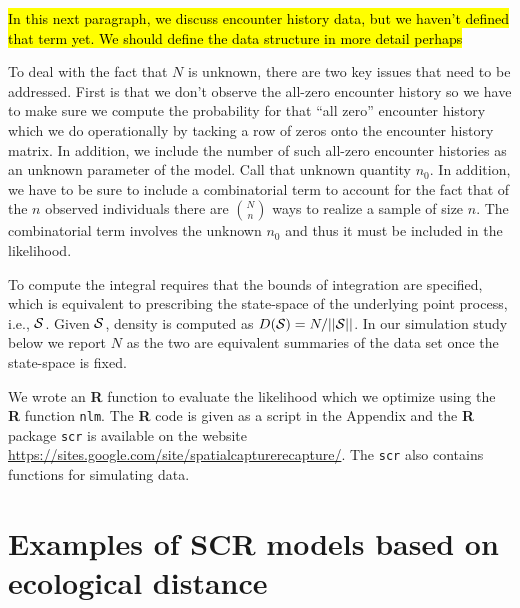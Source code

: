 \documentclass[12pt]{article}
\begin{document}
\hl{In this next paragraph, we discuss encounter history data, but we
  haven't defined that term yet. We should define the data structure
  in more detail perhaps}

To deal with the fact that $N$ is unknown,
there are two key issues that need to be addressed.
First is that
we don't observe the all-zero encounter history so we have to
make sure we compute the probability for that ``all zero'' encounter history which
we do operationally by tacking a row of zeros onto the encounter history matrix. In
addition, we include the number of such all-zero encounter histories
as an unknown parameter of the model. Call that unknown quantity $n_{0}$.
In addition, we have to be sure to include a combinatorial term to
account for the fact that of the $n$ observed individuals there are
${N \choose n}$
 ways to realize a sample of size $n$. The combinatorial term
involves the unknown $n_{0}$ and thus it must be included in the likelihood.

To compute the integral requires that the bounds of integration are
specified, which is equivalent to prescribing the state-space of the
underlying point process, i.e., ${\cal S}$. Given ${\cal S}$, density
is 
computed as $D({\cal S}) = N/||{\cal S}||$. In our simulation study
below we report $N$ as the two are equivalent summaries of the data
set once the state-space is fixed.

We wrote an {\bf R} function to evaluate the likelihood which we optimize
using the {\bf R} function \mbox{\tt nlm}.
The {\bf R} code is given as a script in the Appendix and the {\bf R}
package \mbox{\tt scr}
is available on the website
\url{https://sites.google.com/site/spatialcapturerecapture/}. The
\mbox{\tt scr} also contains
functions for simulating data.


\section{Examples of SCR models based on ecological distance}
\end{document}
